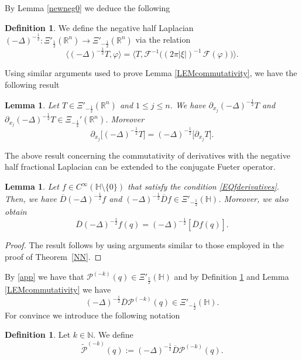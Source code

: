 \documentclass[reqno,11pt]{amsart}
\newtheorem{lemma}[theorem]{Lemma}
\theoremstyle{definition}
\newtheorem{definition}[theorem]{Definition}
\begin{document}
By Lemma \ref{newneg0} we deduce the following


\begin{definition}
\label{newneg1}
We define the negative half Laplacian $
(-\Delta)^{-\frac{1}{2}} : \Xi'_{\frac{1}{2}}(\mathbb{R}^n) \to \Xi'_{-\frac{1}{2}}(\mathbb{R}^n)
$ via the relation
\begin{equation}
\label{negLap}
\bigl\langle (-\Delta)^{-\frac{1}{2}}T, \varphi \bigr\rangle
=
\bigl\langle T, \mathcal{F}^{-1}\!\bigl((2\pi|\xi|)^{-1}\,\mathcal{F}(\varphi)\bigr) \bigr\rangle.
\end{equation}
\end{definition}
Using similar arguments used to prove Lemma \ref{LEMcommutativity}, we have the following result
\begin{lemma}
\label{newder}
Let  $T \in \Xi'_{-\frac{1}{2}}(\mathbb{R}^n)$ and $1 \leq j \leq n$. We have $\partial_{x_j} (-\Delta)^{-\frac{1}{2}}T$ and $\partial_{x_j} (-\Delta)^{-\frac{1}{2}}T \in \Xi_{-\frac{1}{2}}'(\mathbb{R}^n)$. Moreover
	$$	\partial_{x_j} \big[(-\Delta)^{-\frac{1}{2}} T\big]=(-\Delta)^{-\frac{1}{2}} \big[ \partial_{x_j}T\big].$$
\end{lemma}
The above result concerning the commutativity of derivatives with the negative half fractional Laplacian can be extended to the conjugate Fueter operator.
\begin{lemma}
Let $f \in C^\infty (\mathbb{H} \setminus \{0\})$ that satisfy the condition \eqref{EQfderivatives}. Then, we have $\overline{D}(-\Delta)^{-\frac{1}{2}}f$ and $(-\Delta)^{-\frac{1}{2}}\overline{D}f \in \Xi'_{-\frac{1}{2}}(\mathbb{H})$. Moreover, we also obtain
$$ \overline{D}(-\Delta)^{-\frac{1}{2}}f(q)=(-\Delta)^{-\frac{1}{2}}[\overline{D}f(q)].$$
\end{lemma}
\begin{proof}
The result follows by using arguments similar to those employed in the proof of Theorem~\ref{NN}.
\end{proof}

By \eqref{app} we have that $\mathcal{P}^{(-k)}(q) \in \Xi'_{\frac{1}{2}}(\mathbb{H})$ and by Definition \ref{newneg1} and Lemma \ref{LEMcommutativity} we have
\begin{equation}
\label{app1}
(-\Delta)^{-\frac{1}{2}} \overline{D}\mathcal{P}^{(-k)}(q) \in \Xi'_{-\frac{1}{2}}(\mathbb{H}).
\end{equation}
For convince we introduce the following notation
\begin{definition}
Let $k \in \mathbb{N}$. We define
\begin{equation*}
	\widetilde{\mathcal{P}}^{(-k)}(q):=  (-\Delta)^{-\frac{1}{2}} \overline{D}\mathcal{P}^{(-k)}(q).
\end{equation*}
\end{definition}
\end{document}
